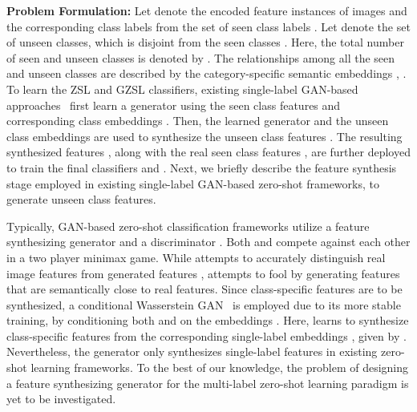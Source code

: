 \documentclass[final]{cvpr}
\begin{document}
\noindent\textbf{Problem Formulation:}
Let  denote the encoded feature instances of images and  the corresponding class labels from the set of  seen class labels . Let  denote the set of  unseen classes, which is disjoint from the seen classes . Here, the total number of seen and unseen classes is denoted by . The relationships among all the seen and unseen classes are described by the category-specific semantic embeddings , . 
To learn the ZSL and GZSL classifiers, existing single-label GAN-based approaches~\cite{xian2018feature,li19leveraging,huang19generative,xian2019f} first learn a generator using the seen class features  and corresponding class embeddings . Then, the learned generator and the unseen class embeddings  are used to synthesize the unseen class features . 
The resulting synthesized features , along with the real seen class features , are further deployed to train the final classifiers  and . Next, we briefly describe the feature synthesis stage employed in existing single-label GAN-based zero-shot frameworks, to generate unseen class features. 


Typically, GAN-based zero-shot classification frameworks utilize a feature synthesizing generator  and a discriminator . Both  and  compete against each other in a two player minimax game. While  attempts to accurately distinguish real image features  from generated features ,  attempts to fool  by generating features that are semantically close to real features. Since class-specific features are to be synthesized, a conditional Wasserstein GAN~\cite{wgan} is employed due to its more stable training, by conditioning both  and  on the embeddings . Here,  learns to synthesize class-specific features  from the corresponding single-label embeddings , given by . Nevertheless, the generator only synthesizes single-label features in existing zero-shot learning frameworks. To the best of our knowledge, the problem of designing a feature synthesizing generator for the multi-label zero-shot learning paradigm is yet to be investigated.
\end{document}
